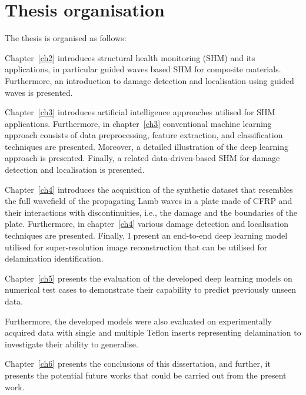 \section{Thesis organisation}
\label{sec15}
The thesis is organised as follows:

Chapter~\ref{ch2} introduces structural health monitoring (SHM) and its applications, in particular guided waves based SHM for composite materials.
Furthermore, an introduction to damage detection and localisation using guided waves is presented.

Chapter~\ref{ch3} introduces artificial intelligence approaches utilised for SHM applications.
Furthermore, in chapter~\ref{ch3}  conventional machine learning approach consists of data preprocessing, feature extraction, and classification techniques are presented.
Moreover, a detailed illustration of the deep learning approach is presented.
Finally, a related data-driven-based SHM for damage detection and localisation is presented.

Chapter~\ref{ch4} introduces the acquisition of the synthetic dataset that resembles the full wavefield of the propagating Lamb waves in a plate made of CFRP and their interactions with discontinuities, i.e., the damage and the boundaries of the plate.
Furthermore, in chapter~\ref{ch4} various damage detection and localisation techniques are presented.
Finally, I present an end-to-end deep learning model utilised for super-resolution image reconstruc\-tion that can be utilised for delamination identification.

Chapter~\ref{ch5} presents the evaluation of the developed deep learning models on numerical test cases to demonstrate their capability to predict previously unseen data.

Furthermore, the developed models were also evaluated on experimentally acquired data with single and multiple Teflon inserts representing delamination to investigate their ability to generalise.

Chapter~\ref{ch6} presents the conclusions of this dissertation, and further, it presents the potential future works that could be carried out from the present work.
